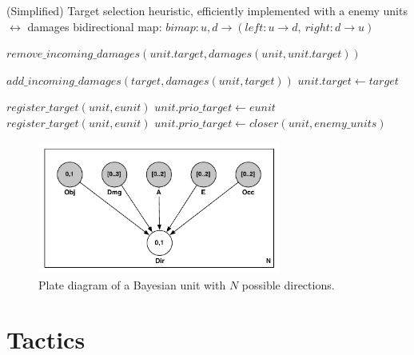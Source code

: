\begin{algorithm}
\caption{(Simplified) Target selection heuristic, efficiently implemented with a enemy units $\leftrightarrow$ damages bidirectional map: $bimap : u, d \rightarrow (left : u \rightarrow d,\ right : d \rightarrow u)$}
\label{alg:targetselection}
\begin{algorithmic}
\State $remove\_incoming\_damages(unit.target, damages(unit,unit.target))$
\EndFunction

\State $add\_incoming\_damages(target, damages(unit, target))$
\State $unit.target \leftarrow target$
\EndFunction

            \State $register\_target(unit, eunit)$
            \State $unit.prio\_target \leftarrow eunit$
        \EndIf 
    \EndIf 
\EndFor
{}
            \State $register\_target(unit, eunit)$
        \EndIf 
    \EndFor
\EndIf
{} %
    $unit.prio\_target \leftarrow closer(unit, enemy\_units)$
\EndIf
\EndFunction
\end{algorithmic}
\end{algorithm}

\begin{figure}[!h]
\begin{center}
\includegraphics[width=8cm]{images/BayesianUnit_plate.pdf}
\caption{Plate diagram of a Bayesian unit with $N$ possible directions.}
\label{fig:BayesianUnit_plate}
\end{center}
\end{figure}

\section{Tactics}


